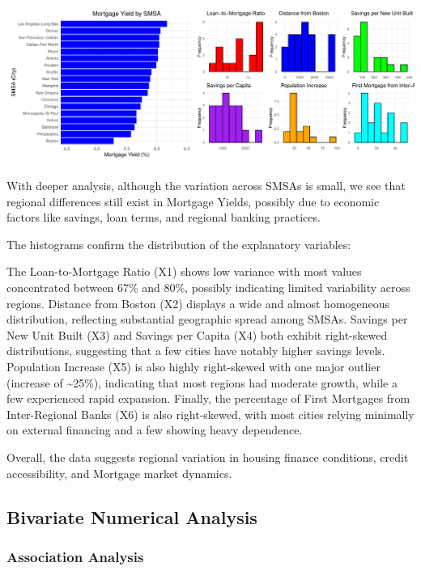 \documentclass[
  11pt,
]{article}
\begin{document}
\includegraphics{Figs/unnamed-chunk-4-1.pdf}

With deeper analysis, although the variation across SMSAs is small, we
see that regional differences still exist in Mortgage Yields, possibly
due to economic factors like savings, loan terms, and regional banking
practices.

The histograms confirm the distribution of the explanatory variables:

The Loan-to-Mortgage Ratio (X1) shows low variance with most values
concentrated between 67\% and 80\%, possibly indicating limited
variability across regions. Distance from Boston (X2) displays a wide
and almost homogeneous distribution, reflecting substantial geographic
spread among SMSAs. Savings per New Unit Built (X3) and Savings per
Capita (X4) both exhibit right-skewed distributions, suggesting that a
few cities have notably higher savings levels. Population Increase (X5)
is also highly right-skewed with one major outlier (increase of
\textasciitilde25\%), indicating that most regions had moderate growth,
while a few experienced rapid expansion. Finally, the percentage of
First Mortgages from Inter-Regional Banks (X6) is also right-skewed,
with most cities relying minimally on external financing and a few
showing heavy dependence.

Overall, the data suggests regional variation in housing finance
conditions, credit accessibility, and Mortgage market dynamics.

\subsection{Bivariate Numerical
Analysis}\label{bivariate-numerical-analysis}

\subsubsection{Association Analysis}\label{association-analysis}
\end{document}
